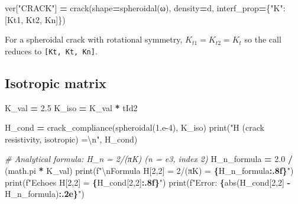 \documentclass[
  a4paper,
  numbers=noendperiod,
  DIV=12]{scrreprt}
\newenvironment{Shaded}{\begin{snugshade}}{\end{snugshade}}
\newcommand{\BuiltInTok}[1]{#1}
\newcommand{\CharTok}[1]{\textcolor[rgb]{0.31,0.60,0.02}{#1}}
\newcommand{\CommentTok}[1]{\textcolor[rgb]{0.56,0.35,0.01}{\textit{#1}}}
\newcommand{\DecValTok}[1]{\textcolor[rgb]{0.00,0.00,0.81}{#1}}
\newcommand{\FloatTok}[1]{\textcolor[rgb]{0.00,0.00,0.81}{#1}}
\newcommand{\NormalTok}[1]{#1}
\newcommand{\OperatorTok}[1]{\textcolor[rgb]{0.81,0.36,0.00}{\textbf{#1}}}
\newcommand{\SpecialCharTok}[1]{\textcolor[rgb]{0.81,0.36,0.00}{\textbf{#1}}}
\newcommand{\SpecialStringTok}[1]{\textcolor[rgb]{0.31,0.60,0.02}{#1}}
\newcommand{\StringTok}[1]{\textcolor[rgb]{0.31,0.60,0.02}{#1}}
\begin{document}
\begin{Shaded}
\begin{Highlighting}[]
\NormalTok{ver[}\StringTok{"CRACK"}\NormalTok{] }\OperatorTok{=}\NormalTok{ crack(shape}\OperatorTok{=}\NormalTok{spheroidal(ω), density}\OperatorTok{=}\NormalTok{d,}
\NormalTok{                     interf\_prop}\OperatorTok{=}\NormalTok{\{}\StringTok{"K"}\NormalTok{: [Kt1, Kt2, Kn]\})}
\end{Highlighting}
\end{Shaded}

For a spheroidal crack with rotational symmetry, \(K_{t1}=K_{t2}=K_t\)
so the call reduces to \texttt{{[}Kt,\ Kt,\ Kn{]}}.

\subsection{Isotropic matrix}\label{isotropic-matrix-1}

\begin{Shaded}
\begin{Highlighting}[]
\NormalTok{K\_val }\OperatorTok{=} \FloatTok{2.5}
\NormalTok{K\_iso }\OperatorTok{=}\NormalTok{ K\_val }\OperatorTok{*}\NormalTok{ tId2}

\NormalTok{H\_cond }\OperatorTok{=}\NormalTok{ crack\_compliance(spheroidal(}\FloatTok{1.e{-}4}\NormalTok{), K\_iso)}
\BuiltInTok{print}\NormalTok{(}\StringTok{"H (crack resistivity, isotropic) =}\CharTok{\textbackslash{}n}\StringTok{"}\NormalTok{, H\_cond)}

\CommentTok{\# Analytical formula: H\_n = 2/(πK)  (n = e3, index 2)}
\NormalTok{H\_n\_formula }\OperatorTok{=} \FloatTok{2.0} \OperatorTok{/}\NormalTok{ (math.pi }\OperatorTok{*}\NormalTok{ K\_val)}
\BuiltInTok{print}\NormalTok{(}\SpecialStringTok{f"}\CharTok{\textbackslash{}n}\SpecialStringTok{Formula H[2,2] = 2/(πK) = }\SpecialCharTok{\{}\NormalTok{H\_n\_formula}\SpecialCharTok{:.8f\}}\SpecialStringTok{"}\NormalTok{)}
\BuiltInTok{print}\NormalTok{(}\SpecialStringTok{f"Echoes  H[2,2]          = }\SpecialCharTok{\{}\NormalTok{H\_cond[}\DecValTok{2}\NormalTok{,}\DecValTok{2}\NormalTok{]}\SpecialCharTok{:.8f\}}\SpecialStringTok{"}\NormalTok{)}
\BuiltInTok{print}\NormalTok{(}\SpecialStringTok{f"Error:                    }\SpecialCharTok{\{}\BuiltInTok{abs}\NormalTok{(H\_cond[}\DecValTok{2}\NormalTok{,}\DecValTok{2}\NormalTok{] }\OperatorTok{{-}}\NormalTok{ H\_n\_formula)}\SpecialCharTok{:.2e\}}\SpecialStringTok{"}\NormalTok{)}
\end{Highlighting}
\end{Shaded}
\end{document}
